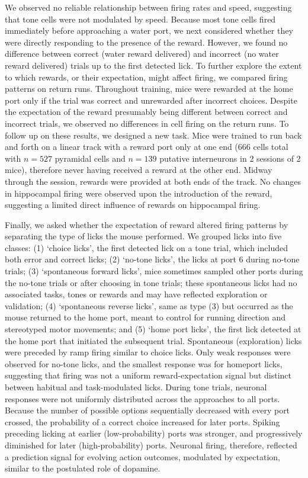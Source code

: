 We observed no reliable relationship between firing rates and speed, suggesting that tone cells were not modulated by speed. Because most tone cells fired immediately before approaching a water port, we next considered whether they were directly responding to the presence of the reward. However, we found no difference between correct (water reward delivered) and incorrect (no water reward delivered) trials up to the first detected lick. To further explore the extent to which rewards, or their expectation, might affect firing, we compared firing patterns on return runs. Throughout training, mice were rewarded at the home port only if the trial was correct and unrewarded after incorrect choices. Despite the expectation of the reward presumably being different between correct and incorrect trials, we observed no differences in cell firing on the return runs. To follow up on these results, we designed a new task. Mice were trained to run back and forth on a linear track with a reward port only at one end (666 cells total with $n = 527$ pyramidal cells and $n = 139$ putative interneurons in 2 sessions of 2 mice), therefore never having received a reward at the other end. Midway through the session, rewards were provided at both ends of the track. No changes in hippocampal firing were observed upon the introduction of the reward, suggesting a limited direct influence of rewards on hippocampal firing.

Finally, we asked whether the expectation of reward altered firing patterns by separating the type of licks the mouse performed. We grouped licks into five classes: (1) `choice licks', the first detected lick on a tone trial, which included both error and correct licks; (2) `no-tone licks', the licks at port 6 during no-tone trials; (3) `spontaneous forward licks', mice sometimes sampled other ports during the no-tone trials or after choosing in tone trials; these spontaneous licks had no associated tasks, tones or rewards and may have reflected exploration or validation; (4) `spontaneous reverse licks', same as type (3) but occurred as the mouse returned to the home port, meant to control for running direction and stereotyped motor movements; and (5) `home port licks', the first lick detected at the home port that initiated the subsequent trial. Spontaneous (exploration) licks were preceded by ramp firing similar to choice licks. Only weak responses were observed for no-tone licks, and the smallest response was for homeport licks, suggesting that firing was not a uniform reward-expectation signal but distinct between habitual and task-modulated licks. During tone trials, neuronal responses were not uniformly distributed across the approaches to all ports. Because the number of possible options sequentially decreased with every port crossed, the probability of a correct choice increased for later ports. Spiking preceding licking at earlier (low-probability) ports was stronger, and progressively diminished for later (high-probability) ports. Neuronal firing, therefore, reflected a prediction signal for evolving action outcomes, modulated by expectation, similar to the postulated role of dopamine.


